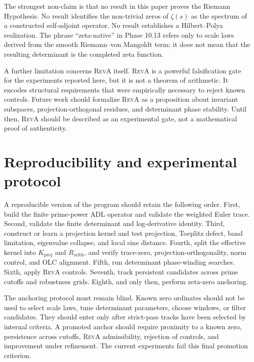 \documentclass[11pt]{article}
\newcommand{\RevA}{\textsc{RevA}}
\newcommand{\Rarith}{R_{\mathrm{arith}}}
\newcommand{\Kproj}{K_{\mathrm{proj}}}
\theoremstyle{definition}
\theoremstyle{plain}
\begin{document}
The strongest non-claim is that no result in this paper proves the Riemann Hypothesis.  No result identifies the non-trivial zeros of $\zeta(s)$ as the spectrum of a constructed self-adjoint operator.  No result establishes a Hilbert--Polya realization.  The phrase ``zeta-native'' in Phase 10.13 refers only to scale laws derived from the smooth Riemann--von Mangoldt term; it does not mean that the resulting determinant is the completed zeta function.

A further limitation concerns \RevA{} itself.  \RevA{} is a powerful falsification gate for the experiments reported here, but it is not a theorem of arithmetic.  It encodes structural requirements that were empirically necessary to reject known controls.  Future work should formalize \RevA{} as a proposition about invariant subspaces, projection-orthogonal residues, and determinant phase stability.  Until then, \RevA{} should be described as an experimental gate, not a mathematical proof of authenticity.

\section{Reproducibility and experimental protocol}

A reproducible version of the program should retain the following order.  First, build the finite prime-power ADL operator and validate the weighted Euler trace.  Second, validate the finite determinant and log-derivative identity.  Third, construct or learn a projection kernel and test projection, Toeplitz defect, band limitation, eigenvalue collapse, and local sine distance.  Fourth, split the effective kernel into $\Kproj$ and $\Rarith$, and verify trace-zero, projection-orthogonality, norm control, and OLC alignment.  Fifth, run determinant phase-winding searches.  Sixth, apply \RevA{} controls.  Seventh, track persistent candidates across prime cutoffs and robustness grids.  Eighth, and only then, perform zeta-zero anchoring.

The anchoring protocol must remain blind.  Known zero ordinates should not be used to select scale laws, tune determinant parameters, choose windows, or filter candidates.  They should enter only after strict-pass tracks have been selected by internal criteria.  A promoted anchor should require proximity to a known zero, persistence across cutoffs, \RevA{} admissibility, rejection of controls, and improvement under refinement.  The current experiments fail this final promotion criterion.
\end{document}
